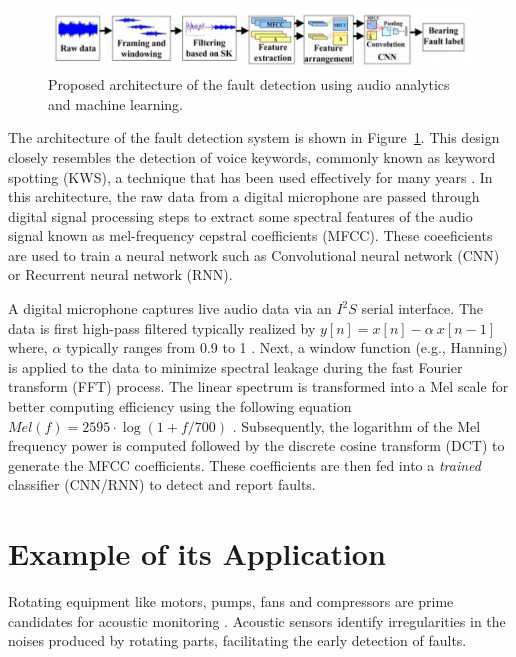 \documentclass[12pt]{article}
\begin{document}
\begin{figure}
\centering
\includegraphics[width=0.9\linewidth]{figs/fig-arch1.png}
\caption{\label{fig:arch1}Proposed architecture of the fault detection using audio analytics and machine learning.}
\end{figure}

The architecture of the fault detection system is shown in Figure~\ref{fig:arch1}. This design closely resembles the detection of voice keywords, commonly known as keyword spotting (KWS), a technique that has been used effectively for many years \cite{chong20220}.
In this architecture, the raw data from a digital microphone are passed through digital signal processing steps to extract some spectral features of the audio signal known as mel-frequency cepstral coefficients (MFCC). These coeeficients are used to train a neural network such as Convolutional neural network (CNN) or Recurrent neural network (RNN). 

A digital microphone captures live audio data via an $I^2S$ serial interface. The data is first high-pass filtered typically realized by $y[n] = x[n] - \alpha~x[n-1]$ where, $\alpha$ typically ranges from 0.9 to 1 \cite{han2006efficient}.
Next, a window function (e.g., Hanning) is applied to the data to minimize spectral leakage during the fast Fourier transform (FFT) process. The linear spectrum is transformed into a Mel scale for better computing efficiency using the following equation $Mel(f) = 2595\cdot \log(1 + f/700)$ \cite{han2006efficient}.
Subsequently, the logarithm of the Mel frequency power is computed followed by the discrete cosine transform (DCT) to generate the MFCC coefficients. These coefficients are then fed into a \textit{trained} classifier (CNN/RNN) to detect and report faults.


\section{Example of its Application}
Rotating equipment like motors, pumps, fans and compressors are prime candidates for acoustic monitoring \cite{judith2017}. Acoustic sensors identify irregularities in the noises produced by rotating parts, facilitating the early detection of faults.
\end{document}
